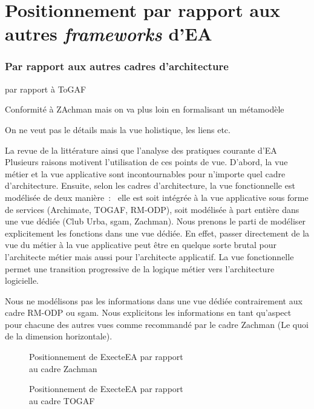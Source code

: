     \section{Positionnement par rapport aux autres \emph{frameworks} d'EA}

\subsubsection{Par rapport aux autres cadres d'architecture}
par rapport à ToGAF

Conformité à ZAchman mais on va plus loin en formalisant un métamodèle

On ne veut pas le détails mais la vue holistique, les liens etc.

La revue de la littérature ainsi que
l'analyse des pratiques courante d'EA Plusieurs raisons
motivent l'utilisation de ces points de vue. D'abord, la vue métier et la vue
applicative sont incontournables pour n'importe quel cadre d'architecture.
Ensuite, selon les cadres d'architecture, la vue fonctionnelle est modélisée de
deux manière~:~ elle est soit intégrée à la vue applicative sous forme de
services (Archimate, TOGAF, RM-ODP), soit modélisée à part entière dans une vue
dédiée (Club Urba, \gls{sgam}, Zachman). Nous prenons le parti de modéliser
explicitement les fonctions dans une vue dédiée. En effet, passer directement
de la vue du métier à la vue applicative peut être en quelque sorte brutal pour
l'architecte métier mais aussi pour l'architecte applicatif. La vue fonctionnelle
permet une transition progressive de la logique métier vers l'architecture
logicielle.

Nous ne modélisons pas les informations dans une vue dédiée contrairement aux
cadre RM-ODP ou \gls{sgam}. Nous explicitons les informations en tant qu'aspect
pour chacune des autres vues comme recommandé par le cadre Zachman (Le quoi de
la dimension horizontale).

\begin{figure}[!ht]
    \begin{center}
    
    \end{center}
    \caption{Positionnement de ExecteEA par rapport\\ au cadre Zachman}
    \label{fig:positionZachman}
\end{figure}


\begin{figure}[!ht]
    \begin{center}
    
    \end{center}
    \caption{Positionnement de ExecteEA par rapport\\ au cadre TOGAF}
    \label{fig:positionTogaf}
\end{figure}

